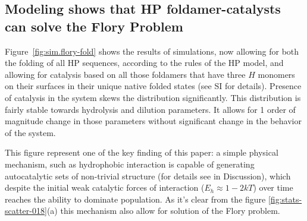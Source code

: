 \documentclass[journal=jacsat,manuscript=article,layout=twocolumn]{achemso}
\begin{document}
\subsection{Modeling shows that HP foldamer-catalysts can solve the Flory Problem}

Figure~\ref{fig:sim.flory-fold} shows the results of simulations, now allowing for both the 
folding of all HP sequences, according to the rules of the HP model, and allowing for catalysis 
based on all those foldamers that have three $H$ monomers on their surfaces in their unique native 
folded states (see SI for details). Presence of catalysis in the system skews the distribution 
significantly. This distribution is fairly stable towards hydrolysis and dilution
parameters. It allows for 1 order of magnitude change in those parameters without significant 
change 
in the behavior of the system.

This figure represent one of the key finding of this paper: a simple physical mechanism, such as 
hydrophobic interaction is capable of generating autocatalytic sets of non-trivial structure (for 
details see in Discussion), which despite the initial weak catalytic forces of 
interaction ($E_h\approx 1-2kT$) over time reaches the ability to dominate population. As it's 
clear from the figure \ref{fig:stats-scatter-018}(a) this mechanism also allow for solution of the 
Flory 
problem.
\end{document}
